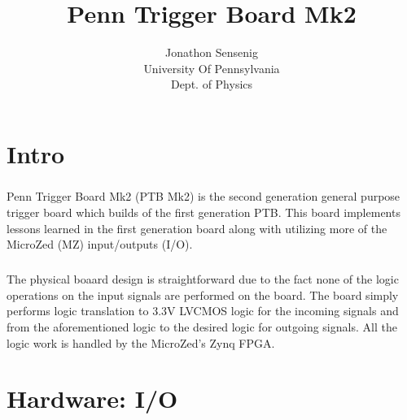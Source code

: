 \documentclass{report}
\begin{document}
\title{Penn Trigger Board Mk2}
\author{Jonathon Sensenig \\ University Of Pennsylvania \\ Dept. of Physics}
\maketitle
\chapter{Intro}
\paragraph{}
 Penn Trigger Board Mk2 (PTB Mk2) is the second generation general purpose trigger board which
  builds of the first generation PTB. This board implements lessons learned in the first generation 
  board along with utilizing more of the MicroZed (MZ) input/outputs (I/O).
\paragraph{}
The physical boaard design is straightforward due to the fact none of the logic operations on the
 input signals are performed on the board. The board simply performs logic translation to 3.3V LVCMOS 
 logic for the incoming signals and from the aforementioned logic to the desired logic for outgoing 
 signals. All the logic work is handled by the MicroZed's Zynq FPGA. 
\chapter{Hardware: I/O}
\section{}
\end{document}
